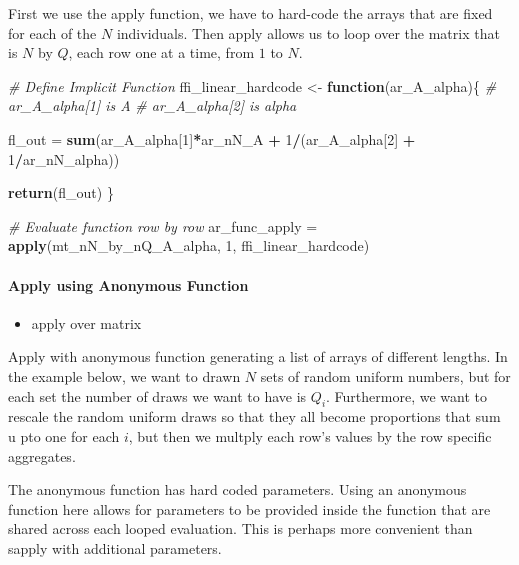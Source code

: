 \documentclass[
]{book}
\newenvironment{Shaded}{\begin{snugshade}}{\end{snugshade}}
\newcommand{\CommentTok}[1]{\textcolor[rgb]{0.56,0.35,0.01}{\textit{#1}}}
\newcommand{\ControlFlowTok}[1]{\textcolor[rgb]{0.13,0.29,0.53}{\textbf{#1}}}
\newcommand{\DecValTok}[1]{\textcolor[rgb]{0.00,0.00,0.81}{#1}}
\newcommand{\KeywordTok}[1]{\textcolor[rgb]{0.13,0.29,0.53}{\textbf{#1}}}
\newcommand{\NormalTok}[1]{#1}
\newcommand{\OperatorTok}[1]{\textcolor[rgb]{0.81,0.36,0.00}{\textbf{#1}}}
\newcommand{\StringTok}[1]{\textcolor[rgb]{0.31,0.60,0.02}{#1}}
\providecommand{\tightlist}{%
  \setlength{\itemsep}{0pt}\setlength{\parskip}{0pt}}
\begin{document}
First we use the apply function, we have to hard-code the arrays that are fixed for each of the \(N\) individuals. Then apply allows us to loop over the matrix that is \(N\) by \(Q\), each row one at a time, from \(1\) to \(N\).

\begin{Shaded}
\begin{Highlighting}[]
\CommentTok{# Define Implicit Function}
\NormalTok{ffi_linear_hardcode <-}\StringTok{ }\ControlFlowTok{function}\NormalTok{(ar_A_alpha)\{}
  \CommentTok{# ar_A_alpha[1] is A}
  \CommentTok{# ar_A_alpha[2] is alpha}

\NormalTok{  fl_out =}\StringTok{ }\KeywordTok{sum}\NormalTok{(ar_A_alpha[}\DecValTok{1}\NormalTok{]}\OperatorTok{*}\NormalTok{ar_nN_A }\OperatorTok{+}\StringTok{ }\DecValTok{1}\OperatorTok{/}\NormalTok{(ar_A_alpha[}\DecValTok{2}\NormalTok{] }\OperatorTok{+}\StringTok{ }\DecValTok{1}\OperatorTok{/}\NormalTok{ar_nN_alpha))}

  \KeywordTok{return}\NormalTok{(fl_out)}
\NormalTok{\}}

\CommentTok{# Evaluate function row by row}
\NormalTok{ar_func_apply =}\StringTok{ }\KeywordTok{apply}\NormalTok{(mt_nN_by_nQ_A_alpha, }\DecValTok{1}\NormalTok{, ffi_linear_hardcode)}
\end{Highlighting}
\end{Shaded}

\hypertarget{apply-using-anonymous-function}{%
\paragraph{Apply using Anonymous Function}\label{apply-using-anonymous-function}}

\begin{itemize}
\tightlist
\item
  apply over matrix
\end{itemize}

Apply with anonymous function generating a list of arrays of different lengths. In the example below, we want to drawn \(N\) sets of random uniform numbers, but for each set the number of draws we want to have is \(Q_i\). Furthermore, we want to rescale the random uniform draws so that they all become proportions that sum u pto one for each \(i\), but then we multply each row's values by the row specific aggregates.

The anonymous function has hard coded parameters. Using an anonymous function here allows for parameters to be provided inside the function that are shared across each looped evaluation. This is perhaps more convenient than sapply with additional parameters.
\end{document}
